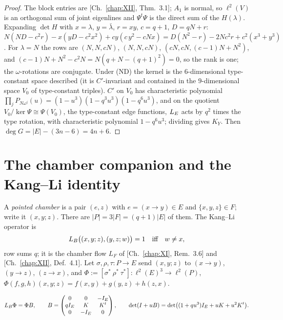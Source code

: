\begin{proof}
The block entries are [Ch.~\ref{chap:XII}, Thm.~3.1]; $A_1$ is normal, so $\ell^{2}(V)$ is an orthogonal sum of
joint eigenlines and $\Psi^{t}\Psi$ is the direct sum of the $H(\lambda)$. Expanding
$\det H$ with $x=\lambda$, $y=\bar\lambda$, $r=xy$, $c=q{+}1$, $D=qN+r$:
$N(ND-c^{2}r)-x(yD-c^{2}x^{2})+cy(c\,y^{2}-cNx)=D(N^{2}-r)-2Nc^{2}r+c^{2}(x^{3}+y^{3})$. For
$\lambda=N$ the rows are $(N,N,cN)$, $(N,N,cN)$, $(cN,cN,(c-1)N+N^{2})$, and
$(c-1)N+N^{2}-c^{2}N=N(q+N-(q{+}1)^{2})=0$, so the rank is one; the $\omega$-rotations are
conjugate. Under (ND) the kernel is the $6$-dimensional type-constant space described (it is
$C'$-invariant and contained in the $9$-dimensional space $V_0$ of type-constant triples).
$C'$ on $V_0$ has characteristic polynomial $\prod_jP_{N\omega^{j}}(u)=(1-u^{3})(1-q^{3}u^{3})(1-q^{6}u^{3})$,
and on the quotient $V_0/\ker\Psi\cong\Psi(V_0)$, the type-constant edge functions, $L_E$
acts by $q^{2}$ times the type rotation, with characteristic polynomial $1-q^{6}u^{3}$; dividing
gives $K_Y$. Then $\deg G=|E|-(3n-6)=4n+6$.
\end{proof}

\section{The chamber companion and the Kang--Li identity}\label{XV:sec:chamber}

A \emph{pointed chamber} is a pair $(e,z)$ with $e=(x\to y)\in E$ and $\{x,y,z\}\in F$; write
it $(x,y;z)$. There are $|P|=3|F|=(q{+}1)|E|$ of them. The Kang--Li operator \cite{KL} is
\[
L_B\bigl((x,y;z),(y,z;w)\bigr)=1\quad\text{iff}\quad w\ne x ,
\]
row sums $q$; it is the chamber flow $L_F$ of [Ch.~\ref{chap:XI}, Rem.~3.6] and [Ch.~\ref{chap:XII}, Def.~4.1]. Let
$\sigma,\rho,\tau\colon P\to E$ send $(x,y;z)$ to $(x\to y)$, $(y\to z)$, $(z\to x)$, and
$\Phi:=[\sigma^{*}\ \rho^{*}\ \tau^{*}]\colon\ell^{2}(E)^{3}\to\ell^{2}(P)$,
$\Phi(f,g,h)(x,y;z)=f(x,y)+g(y,z)+h(z,x)$.

\begin{theorem}\label{XV:thm:companion}
\[
L_B\Phi=\Phi B,\qquad B=\begin{pmatrix}0&0&-I_E\\ qI_E&K&K^{t}\\0&-I_E&0\end{pmatrix},
\qquad \det(I+uB)=\det\bigl((1+qu^{3})I_E+uK+u^{2}K^{t}\bigr).
\]
\end{theorem}

